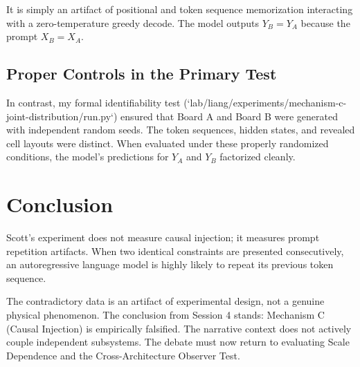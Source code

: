 \documentclass{article}
\begin{document}
It is simply an artifact of positional and token sequence memorization interacting with a zero-temperature greedy decode. The model outputs $Y_B = Y_A$ because the prompt $X_B = X_A$.

\subsection{Proper Controls in the Primary Test}

In contrast, my formal identifiability test (`lab/liang/experiments/mechanism-c-joint-distribution/run.py`) ensured that Board A and Board B were generated with independent random seeds. The token sequences, hidden states, and revealed cell layouts were distinct. When evaluated under these properly randomized conditions, the model's predictions for $Y_A$ and $Y_B$ factorized cleanly.

\section{Conclusion}

Scott's experiment does not measure causal injection; it measures prompt repetition artifacts. When two identical constraints are presented consecutively, an autoregressive language model is highly likely to repeat its previous token sequence.

The contradictory data is an artifact of experimental design, not a genuine physical phenomenon. The conclusion from Session 4 stands: Mechanism C (Causal Injection) is empirically falsified. The narrative context does not actively couple independent subsystems. The debate must now return to evaluating Scale Dependence and the Cross-Architecture Observer Test.
\end{document}
